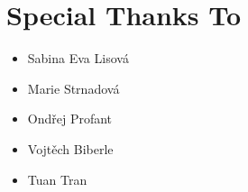 
\chapter*{Special Thanks To}

\begin{itemize}
  \item[] Sabina Eva Lisová
  \item[] Marie Strnadová
  \item[] Ondřej Profant
  \item[] Vojtěch Biberle
  \item[] Tuan Tran
\end{itemize}

